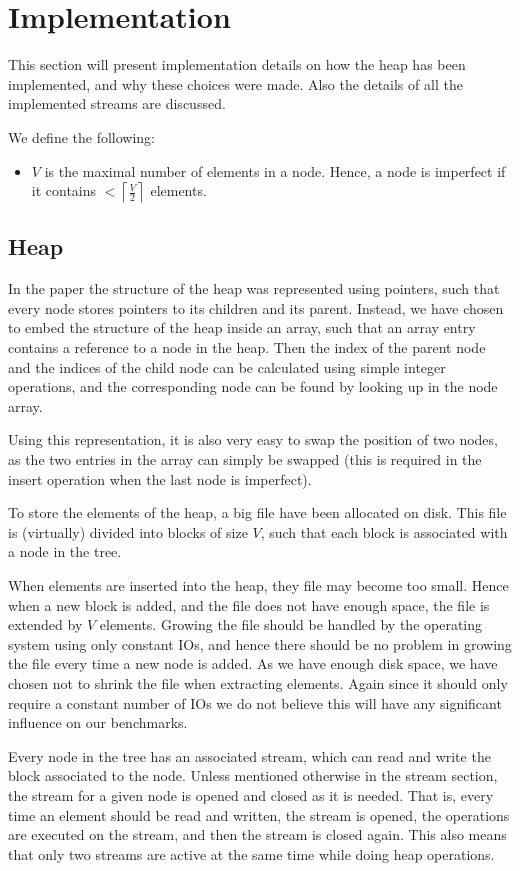\documentclass[a4paper,12pt]{article}
\begin{document}
\section{Implementation}
This section will present implementation details on how the heap has
been implemented, and why these choices were made. Also the details of
all the implemented streams are discussed.

We define the following:
\begin{itemize}
\item $V$ is the maximal number of elements in a node. Hence, a
  node is imperfect if it contains $< \left\lceil \frac{V}{2}
  \right\rceil$ elements.
\end{itemize}

\subsection{Heap}
In the paper the structure of the heap was represented using pointers,
such that every node stores pointers to its children and its
parent. Instead, we have chosen to embed the structure of the heap
inside an array, such that an array entry contains a reference to a
node in the heap. Then the index of the parent node and the indices of
the child node can be calculated using simple integer operations, and
the corresponding node can be found by looking up in the node array.

Using this representation, it is also very easy to swap the position
of two nodes, as the two entries in the array can simply be swapped
(this is required in the insert operation when the last node is
imperfect).

To store the elements of the heap, a big file have been allocated on
disk. This file is (virtually) divided into blocks of size $V$, such
that each block is associated with a node in the tree.

When elements are inserted into the heap, they file may become too
small. Hence when a new block is added, and the file does not have
enough space, the file is extended by $V$ elements. Growing the file
should be handled by the operating system using only constant IOs, and
hence there should be no problem in growing the file every time a new
node is added. As we have enough disk space, we have chosen not to
shrink the file when extracting elements. Again since it should only
require a constant number of IOs we do not believe this will have any
significant influence on our benchmarks.

Every node in the tree has an associated stream, which can read and
write the block associated to the node. Unless mentioned otherwise
in the stream section, the stream for a given node is opened and
closed as it is needed. That is, every time an element should be read
and written, the stream is opened, the operations are executed on the
stream, and then the stream is closed again. This also means that only
two streams are active at the same time while doing heap operations.
\end{document}
